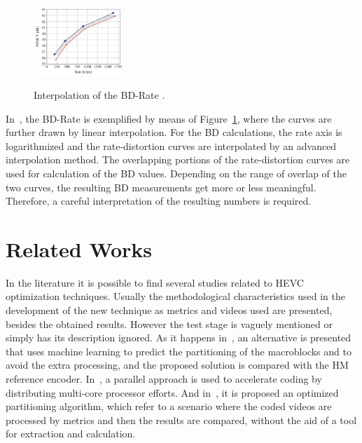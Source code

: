 \documentclass[journal]{IEEEtran}
\begin{document}
\FloatBarrier
\begin{figure}[!ht]
	\centering
	\caption{Interpolation of the BD-Rate \cite{Mathias}.}
	\includegraphics[width=0.3\textwidth]{figures/chartbdrate.png}
	\label{fig:chart_barate}
\end{figure}
\FloatBarrier


In~\cite{Mathias}, the BD-Rate is exemplified by means of Figure~\ref{fig:chart_barate}, where the curves are further drawn by linear interpolation. For the BD calculations, the rate axis is logarithmized and the rate-distortion curves are interpolated by an advanced interpolation method. The overlapping portions of the rate-distortion curves are used for calculation of the BD values. Depending on the range of overlap of the two curves, the resulting BD measurements get more or less meaningful. Therefore, a careful interpretation of the resulting numbers is required.




\section{Related Works}

In the literature it is possible to find several studies related to HEVC optimization techniques. Usually the methodological characteristics used in the development of the new technique as metrics and videos used are presented, besides the obtained results. However the test stage is vaguely mentioned or simply has its description ignored. As it happens in~\cite{oliveira:16}, an alternative is presented that uses machine learning to predict the partitioning of the macroblocks and to avoid the extra processing, and the proposed solution is compared with the HM reference encoder. In~\cite{Wang:16}, a parallel approach is used to accelerate coding by distributing multi-core processor efforts. And in~\cite{wang:13}, it is proposed an optimized partitioning algorithm, which refer to a scenario where the coded videos are processed by metrics and then the results are compared, without the aid of a tool for extraction and calculation.
\end{document}
